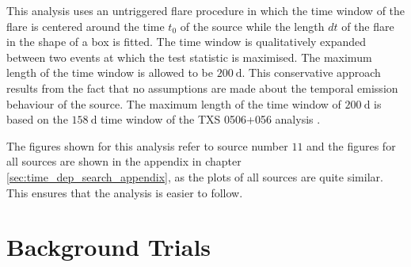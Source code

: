 This analysis uses an untriggered flare procedure in which the time window of the flare is centered around the time $t_0$ of the source while the length $dt$ of the flare in the shape of a box is fitted.
The time window is qualitatively expanded between two events at which the test statistic is maximised.
The maximum length of the time window is allowed to be $\SI{200}{\day}$.
This conservative approach results from the fact that no assumptions are made about the temporal emission behaviour of the source.
The maximum length of the time window of $\SI{200}{\day}$ is based on the $\SI{158}{\day}$ time window of the TXS 0506+056 analysis \cite{_txs}.

The figures shown for this analysis refer to source number $\num{11}$ and the figures for all sources are shown in the appendix in chapter \ref{sec:time_dep_search_appendix}, as the plots of all sources are quite similar.
This ensures that the analysis is easier to follow.

\section{Background Trials}

